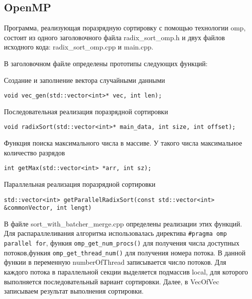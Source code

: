 \documentclass{report}
\begin{document}
\subsection*{OpenMP}
\par Программа, реализующая поразрядную сортировку с помощью технологии omp, состоит из одного заголовочного файла radix\_sort\_omp.h и двух файлов исходного кода: radix\_sort\_omp.cpp и main.cpp.
\par В заголовочном файле определены прототипы следующих функций:
\par Создание и заполнение вектора случайными данными \par
\begin{lstlisting}
void vec_gen(std::vector<int>* vec, int len);
\end{lstlisting}
\par Последовательная реализация поразрядной сортировки \par
\begin{lstlisting}
void radixSort(std::vector<int>* main_data, int size, int offset);
\end{lstlisting}
\par Функция поиска максимального числа в массиве. У такого числа максимальное количество разрядов \par
\begin{lstlisting}
int getMax(std::vector<int> *arr, int sz);
\end{lstlisting}
\par Параллельная реализация поразрядной сортировки \par
\begin{lstlisting}
std::vector<int> getParallelRadixSort(const std::vector<int> &commonVector, int lengt)
\end{lstlisting}
\par В файле  sort\_with\_batcher\_merge.cpp определены реализации этих функций. Для распараллеливания алгоритма использовалась директива 
\verb|#pragma omp parallel for|, функия \newline \verb|omp_get_num_procs()| для получения числа доступных потоков,функия \verb|omp_get_thread_num()| для получения номера потока. В данной функии в переменную numberOfThread записывается число потоков. Для каждого потока в параллельной секции выделяется подмассив local, для которого выполняется последовательный вариант сортировки. Далее, в VecOfVec записываем результат выполнения сортировки.
\end{document}
